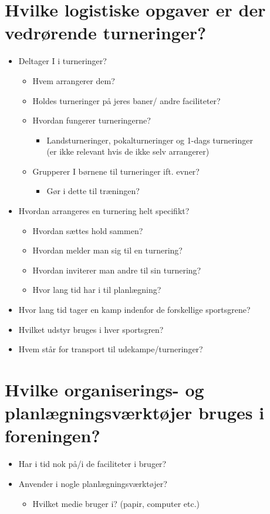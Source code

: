 \section{Hvilke logistiske opgaver er der vedrørende turneringer?}
\begin{itemize}
    \item Deltager I i turneringer?
    \begin{itemize}
        \item Hvem arrangerer dem?
        \item Holdes turneringer på jeres baner/ andre faciliteter?
        \item Hvordan fungerer turneringerne?
        \begin{itemize}
            \item Landsturneringer, pokalturneringer og 1-dags turneringer\\
            (er ikke relevant hvis de ikke selv arrangerer)
        \end{itemize}
        \item Grupperer I børnene til turneringer ift. evner?
        \begin{itemize}
            \item  Gør i dette til træningen?
        \end{itemize}
    \end{itemize}
    \item Hvordan arrangeres en turnering helt specifikt?
    \begin{itemize}
        \item Hvordan sættes hold sammen?
        \item Hvordan melder man sig til en turnering?
        \item Hvordan inviterer man andre til sin turnering?
        \item Hvor lang tid har i til planlægning?
    \end{itemize}
    \item Hvor lang tid tager en kamp indenfor de forskellige sportsgrene?
    \item Hvilket udstyr bruges i hver sportsgren?
    \item Hvem står for transport til udekampe/turneringer?
\end{itemize}

\section{Hvilke organiserings- og planlægningsværktøjer bruges i foreningen?}
\begin{itemize}
    \item Har i tid nok på/i de faciliteter i bruger?
    \item Anvender i nogle planlægningsværktøjer?
    \begin{itemize}
        \item Hvilket medie bruger i? (papir, computer etc.)
    \end{itemize}
\end{itemize}

